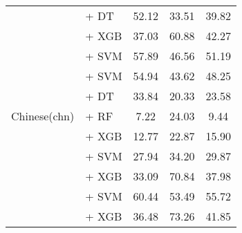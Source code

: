 \begin{longtable}{llccc}
    \midrule
    \multirow{14}{*}{Chinese(chn)}        & \citep{li2024conanembeddinggeneraltextembedding} + DT                  & 52.12                                & 33.51              & 39.82             \\
                                          & \citep{li2024conanembeddinggeneraltextembedding} + XGB                 & 37.03                                & 60.88              & 42.27             \\
                                          & \citep{li2024conanembeddinggeneraltextembedding} + SVM                 & 57.89                                & 46.56              & 51.19             \\
                                          & \citep{wang2024multilingual} + SVM                                     & 54.94                                & 43.62              & 48.25             \\
                                          & \citep{zhang2024gme} + DT                                              & 33.84                                & 20.33              & 23.58             \\
                                          & \citep{zhang2024gme} + RF                                              & 7.22                                 & 24.03              & 9.44              \\
                                          & \citep{zhang2024gme} + XGB                                             & 12.77                                & 22.87              & 15.90             \\
                                          & \citep{zhang2024gme} + SVM                                             & 27.94                                & 34.20              & 29.87             \\
                                          & \citep{lier0072023xiaobuembeddingv2} + XGB                             & 33.09                                & 70.84              & 37.98             \\
                                          & \citep{lier0072023xiaobuembeddingv2} + SVM                             & 60.44                                & 53.49              & 55.72             \\
                                          & \citep{zpoint-large-embedding-zh} + XGB                                & 36.48                                & 73.26              & 41.85             \\

\end{longtable}

